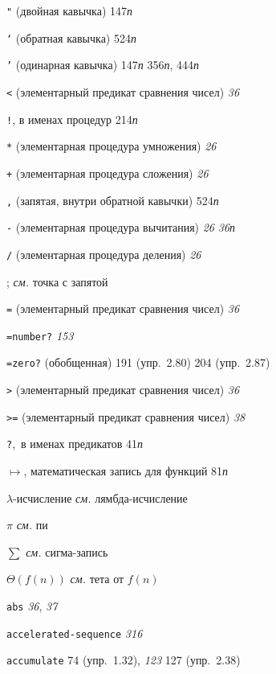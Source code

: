 \begin{theindex}
\item {\texttt{"} (двойная кавычка)} 147{\it п}
\item {\texttt{`} (обратная кавычка)} 524{\it п}
\item {\texttt{'} (одинарная кавычка)} 147{\it п}
   356{\it п}, 444{\it п}
\item {\texttt{<} (элементарный предикат сравнения чисел)} {\it 36}
\item {\texttt{!}, в именах процедур} 214{\it п}
\item {\texttt{*} (элементарная процедура умножения)} {\it 26}
\item {\texttt{+} (элементарная процедура сложения)} {\it 26}
\item {\texttt{,} (запятая, внутри обратной кавычки)} 524{\it п}
\item {\texttt{-} (элементарная процедура вычитания)} {\it 26}
   {\it 36}{\it п}
\item {\texttt{/} (элементарная процедура деления)} {\it 26}
\item {;} {\it см.} точка с запятой
\item {\texttt{=} (элементарный предикат сравнения чисел)} {\it 36}
\item {\texttt{=number?}} {\it 153}
\item {\texttt{=zero?} (обобщенная)} 191 (упр.~2.80)
   204 (упр.~2.87)
\item {\texttt{>} (элементарный предикат сравнения чисел)} {\it 36}
\item {\texttt{>=} (элементарный предикат сравнения чисел)} {\it 38}
\item {\texttt{?},~в именах предикатов} 41{\it п}
\item {$\mapsto$, математическая запись для функций} 81{\it п}
\item {$\lambda$-исчисление} {\it см.} лямбда-исчисление
\item {$\pi$} {\it см.} пи
\item {$\sum$} {\it см.} сигма-запись
\item {$\Theta(f(n))$} {\it см.} тета от $f(n)$
\bigskip
\item {\texttt{abs}} {\it 36}, {\it 37}
\item {\texttt{accelerated-sequence}} {\it 316}
\item {\texttt{accumulate}} 74 (упр.~1.32), {\it 123}
   127 (упр.~2.38)

\end{theindex}
